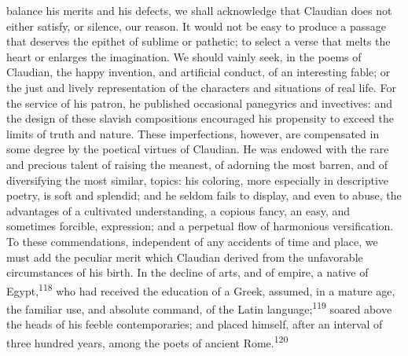balance his merits and his defects, we shall acknowledge that
Claudian does not either satisfy, or silence, our reason. It
would not be easy to produce a passage that deserves the epithet
of sublime or pathetic; to select a verse that melts the heart or
enlarges the imagination. We should vainly seek, in the poems of
Claudian, the happy invention, and artificial conduct, of an
interesting fable; or the just and lively representation of the
characters and situations of real life. For the service of his
patron, he published occasional panegyrics and invectives: and
the design of these slavish compositions encouraged his
propensity to exceed the limits of truth and nature. These
imperfections, however, are compensated in some degree by the
poetical virtues of Claudian. He was endowed with the rare and
precious talent of raising the meanest, of adorning the most
barren, and of diversifying the most similar, topics: his
coloring, more especially in descriptive poetry, is soft and
splendid; and he seldom fails to display, and even to abuse, the
advantages of a cultivated understanding, a copious fancy, an
easy, and sometimes forcible, expression; and a perpetual flow of
harmonious versification. To these commendations, independent of
any accidents of time and place, we must add the peculiar merit
which Claudian derived from the unfavorable circumstances of his
birth. In the decline of arts, and of empire, a native of Egypt,\textsuperscript{118}
who had received the education of a Greek, assumed, in a
mature age, the familiar use, and absolute command, of the Latin
language;\textsuperscript{119} soared above the heads of his feeble
contemporaries; and placed himself, after an interval of three
hundred years, among the poets of ancient Rome.\textsuperscript{120}



